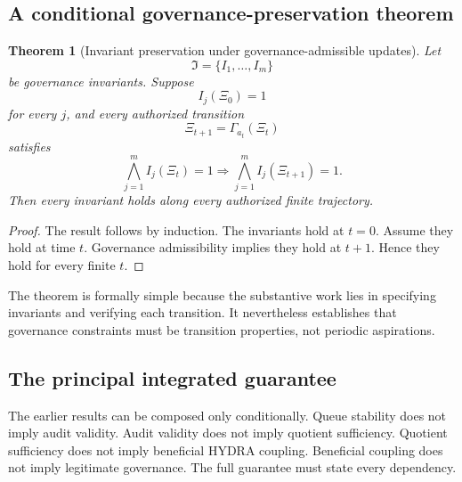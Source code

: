 \documentclass[11pt]{article}
\newtheorem{theorem}[definition]{Theorem}
\theoremstyle{definition}
\begin{document}
\subsection{A conditional governance-preservation theorem}

\begin{theorem}[Invariant preservation under governance-admissible updates]
Let
\[
\mathfrak{I}
=
\{
I_1,\ldots,I_m
\}
\]
be governance invariants. Suppose
\[
I_j(\Xi_0)=1
\]
for every \(j\), and every authorized transition
\[
\Xi_{t+1}
=
\Gamma_{a_t}(\Xi_t)
\]
satisfies
\[
\bigwedge_{j=1}^{m}I_j(\Xi_t)=1
\Longrightarrow
\bigwedge_{j=1}^{m}I_j(\Xi_{t+1})=1.
\]
Then every invariant holds along every authorized finite trajectory.
\end{theorem}

\begin{proof}
The result follows by induction. The invariants hold at \(t=0\). Assume they hold at time \(t\). Governance admissibility implies they hold at \(t+1\). Hence they hold for every finite \(t\).
\end{proof}

The theorem is formally simple because the substantive work lies in specifying invariants and verifying each transition. It nevertheless establishes that governance constraints must be transition properties, not periodic aspirations.

\subsection{The principal integrated guarantee}

The earlier results can be composed only conditionally. Queue stability does not imply audit validity. Audit validity does not imply quotient sufficiency. Quotient sufficiency does not imply beneficial HYDRA coupling. Beneficial coupling does not imply legitimate governance. The full guarantee must state every dependency.
\end{document}
